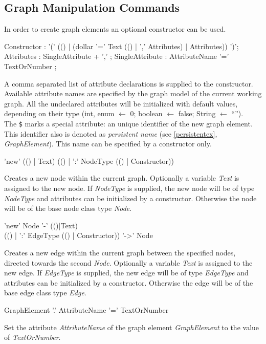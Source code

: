 \subsection{Graph Manipulation Commands}
\label{mani}
In order to create graph elements an optional constructor can be used. 
\begin{rail}
  Constructor : '(' (() | (dollar '=' Text (() | ',' Attributes) | Attributes)) ')';
  Attributes : SingleAttribute + ',' ;
  SingleAttribute : AttributeName '=' TextOrNumber ; 
\end{rail}
A comma separated list of attribute declarations is supplied to the constructor. Available attribute names are specified by the graph model of the current working graph. All the undeclared attributes will be initialized with default values, depending on their type (int, enum $\leftarrow$ 0; boolean $\leftarrow$ false; String $\leftarrow$ ``'').\\
The \texttt{\$} marks a special attribute: an unique identifier of the new graph element. This identifier also is denoted as \emph{persistent name} (see \ref{persistentex}, \emph{GraphElement}). This name can be specified by a constructor only.

\begin{rail}
  'new' (() | Text) (() | ':' NodeType (() | Constructor))
\end{rail}
Creates a new node within the current graph. Optionally a variable \emph{Text} is assigned to the new node. If \emph{NodeType} is supplied, the new node will be of type \emph{NodeType} and attributes can be initialized by a constructor. Otherwise the node will be of the base node class type \emph{Node}.

\begin{rail}
  'new' Node '-' (()|Text) \\ (() | ':' EdgeType (() | Constructor)) '->' Node
\end{rail}
Creates a new edge within the current graph between the specified nodes, directed towards the second \emph{Node}. Optionally  a variable \emph{Text} is assigned to the new edge. If \emph{EdgeType} is supplied, the new edge will be of type \emph{EdgeType} and attributes can be initialized by a constructor. Otherwise the edge will be of the base edge class type \emph{Edge}.

\begin{rail}
  GraphElement '.' AttributeName '=' TextOrNumber
\end{rail}
Set the attribute \emph{AttributeName} of the graph element \emph{GraphElement} to the value of \emph{TextOrNumber}.

